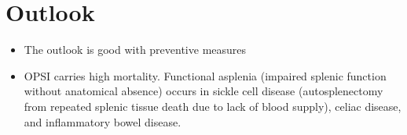 \section{Outlook}
\begin{itemize}[noitemsep]
  \item The outlook is good with preventive measures
  \item OPSI carries high mortality. Functional asplenia (impaired splenic function without anatomical absence) occurs in sickle cell disease (autosplenectomy from repeated splenic tissue death due to lack of blood supply), celiac disease, and inflammatory bowel disease.
\end{itemize}
